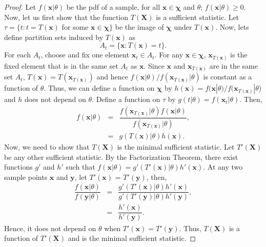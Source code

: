 \documentclass[a4paper,english,12pt]{article}
\newcommand{\bx}{\mathbf{x}}
\newcommand{\by}{\mathbf{y}}
\newcommand{\bX}{\mathbf{X}}
\begin{document}
\begin{proof}
Let $f(\bx|\theta)$ be the pdf of a sample, for all $\bx\in\boldsymbol\chi$ and $\theta$; $f(\bx|\theta)\geq 0$.
Now, let us first show that the function $T(\bX)$ is a sufficient statistic. Let $\tau = \{t:t=T(\bx)$ for some $\bx\in\boldsymbol\chi\}$ be the image of $\boldsymbol\chi$ under $T(\bx)$. Now, lets define partition sets induced by $T(\bx)$ as
\begin{equation}
A_t=\{\bx:T(\bx) = t\}.
\end{equation}
For each $A_t$, choose and fix one element $\bx_t \in A_t$. For any $\bx\in\boldsymbol\chi$, $\bx_{T(\bx)}$ is the fixed element that is in the same set $A_t$ as $\bx$. Since $\bx$ and $\bx_{T(\bx)}$ are in the same set $A_t$, $T(\bx) = T(\bx_{T(\bx)})$ and hence $f(\bx|\theta)/f(\bx_{T(\bx)}|\theta)$ is constant as a function of $\theta$. Thus, we can define a function on $\boldsymbol\chi$ by $h(\bx) = f(\bx|\theta)/f(\bx_{T(\bx)}|\theta$) and $h$ does not depend on $\theta$. Define a function on $\tau$ by $g(t|\theta)=f(\bx_t|\theta)$. Then,
\begin{eqnarray}
f(\bx|\theta)&=&\dfrac{f(\bx_{T(\bx)}|\theta)f(\bx|\theta)}{f(\bx_{T(\bx)}|\theta)},\\
&=&g(T(\bx)|\theta)h(\bx).
\end{eqnarray}
Now, we need to show that $T(\bX)$ is the minimal sufficient statistic. Let $T'(\bX)$ be any other sufficient statistic. By the Factorization Theorem, there exist functions $g'$ and $h'$ such that $f(\bx|\theta) = g'(T'(\bx)|\theta)h'(\bx).$ At any two sample points $\bx$ and $\by$, let $T'(\bx)$ = $T'(\by)$, then,
\begin{eqnarray}
\dfrac{f(\bx|\theta)}{f(\by|\theta)} &=& \dfrac{g'(T'(\bx)|\theta)h'(\bx)}{g'(T'(\by)|\theta)h'(\by)},\\
&=& \dfrac{h'(\bx)}{h'(\by)}.
\end{eqnarray}
Hence, it does not depend on $\theta$ when $T'(\bx)=T'(\by)$. Thus, $T(\bX)$ is a function of $T'(\bX)$ and is the minimal sufficient statistic.
\end{proof}
\end{document}
